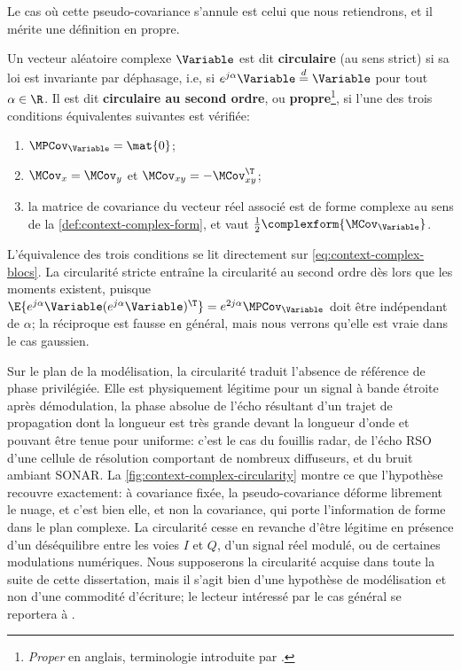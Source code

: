 Le cas où cette pseudo-covariance s'annule est celui que nous retiendrons, et il mérite une définition en propre.

\begin{definition}[{Circularité}]
\label{def:context-complex-circularity}
  Un vecteur aléatoire complexe $\Variable$ est dit \textbf{circulaire} (au sens strict) si sa loi est invariante par déphasage, i.e, si $e^{j\alpha}\Variable\overset{d}{=}\Variable$ pour tout $\alpha\in\R$. Il est dit \textbf{circulaire au second ordre}, ou \textbf{propre}\footnote{\emph{Proper} en anglais, terminologie introduite par .}, si l'une des trois conditions équivalentes suivantes est vérifiée:
  \begin{enumerate}
    \item $\MPCov_\Variable = \mat{0}$;
    \item $\MCov_x = \MCov_y$ et $\MCov_{xy} = -\MCov_{xy}^\T$;
    \item la matrice de covariance du vecteur réel associé est de forme complexe au sens de la \cref{def:context-complex-form}, et vaut $\frac12\complexform{\MCov_\Variable}$.
  \end{enumerate}
\end{definition}

\begin{remark}
  L'équivalence des trois conditions se lit directement sur \cref{eq:context-complex-blocs}. La circularité stricte entraîne la circularité au second ordre dès lors que les moments existent, puisque $\E\{e^{j\alpha}\Variable(e^{j\alpha}\Variable)^\T\} = e^{2j\alpha}\MPCov_\Variable$ doit être indépendant de $\alpha$; la réciproque est fausse en général, mais nous verrons qu'elle est vraie dans le cas gaussien.

  Sur le plan de la modélisation, la circularité traduit l'absence de référence de phase privilégiée. Elle est physiquement légitime pour un signal à bande étroite après démodulation, la phase absolue de l'écho résultant d'un trajet de propagation dont la longueur est très grande devant la longueur d'onde et pouvant être tenue pour uniforme: c'est le cas du fouillis radar, de l'écho RSO d'une cellule de résolution comportant de nombreux diffuseurs, et du bruit ambiant SONAR. La \cref{fig:context-complex-circularity} montre ce que l'hypothèse recouvre exactement: à covariance fixée, la pseudo-covariance déforme librement le nuage, et c'est bien elle, et non la covariance, qui porte l'information de forme dans le plan complexe. La circularité cesse en revanche d'être légitime en présence d'un déséquilibre entre les voies $I$ et $Q$, d'un signal réel modulé, ou de certaines modulations numériques. Nous supposerons la circularité acquise dans toute la suite de cette dissertation, mais il s'agit bien d'une hypothèse de modélisation et non d'une commodité d'écriture; le lecteur intéressé par le cas général se reportera à .
\end{remark}

